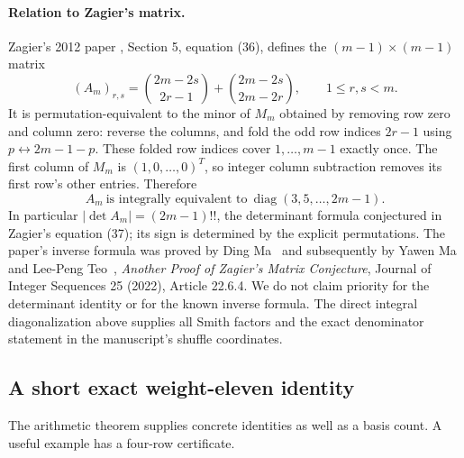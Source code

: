 \documentclass[11pt,letterpaper]{article}
\theoremstyle{definition}
\theoremstyle{remark}
\begin{document}
\paragraph{Relation to Zagier's matrix.}
Zagier's 2012 paper \cite{Zagier}, Section 5, equation (36), defines the
$(m-1)\times(m-1)$ matrix
\[
 (A_m)_{r,s}=\binom{2m-2s}{2r-1}
             +\binom{2m-2s}{2m-2r},\qquad 1\leq r,s<m.
\]
It is permutation-equivalent to the minor of $M_m$ obtained by removing
row zero and column zero: reverse the columns, and fold the odd row
indices $2r-1$ using $p\leftrightarrow2m-1-p$.  These folded row
indices cover $1,\ldots,m-1$ exactly once.  The first column of $M_m$
is $(1,0,\ldots,0)^T$, so integer column subtraction removes its first
row's other entries.  Therefore
\[
 A_m\ \text{is integrally equivalent to}\
 \operatorname{diag}(3,5,\ldots,2m-1).
\]
In particular $|\det A_m|=(2m-1)!!$, the determinant formula conjectured
in Zagier's equation (37); its sign is determined by the explicit
permutations.  The paper's inverse formula was proved by Ding Ma~\cite{Ma} and subsequently by Yawen Ma and
Lee-Peng Teo~\cite{MaTeo},
\emph{Another Proof of Zagier's Matrix Conjecture}, Journal of Integer
Sequences 25 (2022), Article 22.6.4.  We do not claim priority for the
determinant identity or for the known inverse formula.  The direct
integral diagonalization above supplies all Smith factors and the exact
denominator statement in the manuscript's shuffle coordinates.

\subsection{A short exact weight-eleven identity}

The arithmetic theorem supplies concrete identities as well as a basis
count.  A useful example has a four-row certificate.
\end{document}
